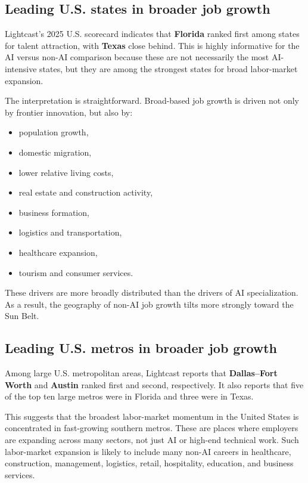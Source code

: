 \documentclass[12pt,a4paper]{article}
\begin{document}
\subsection{Leading U.S. states in broader job growth}

Lightcast's 2025 U.S. scorecard indicates that \textbf{Florida} ranked first among states for talent attraction, with \textbf{Texas} close behind. This is highly informative for the AI versus non-AI comparison because these are not necessarily the most AI-intensive states, but they are among the strongest states for broad labor-market expansion.

The interpretation is straightforward. Broad-based job growth is driven not only by frontier innovation, but also by:

\begin{itemize}
    \item population growth,
    \item domestic migration,
    \item lower relative living costs,
    \item real estate and construction activity,
    \item business formation,
    \item logistics and transportation,
    \item healthcare expansion,
    \item tourism and consumer services.
\end{itemize}

These drivers are more broadly distributed than the drivers of AI specialization. As a result, the geography of non-AI job growth tilts more strongly toward the Sun Belt.

\subsection{Leading U.S. metros in broader job growth}

Among large U.S. metropolitan areas, Lightcast reports that \textbf{Dallas--Fort Worth} and \textbf{Austin} ranked first and second, respectively. It also reports that five of the top ten large metros were in Florida and three were in Texas.

This suggests that the broadest labor-market momentum in the United States is concentrated in fast-growing southern metros. These are places where employers are expanding across many sectors, not just AI or high-end technical work. Such labor-market expansion is likely to include many non-AI careers in healthcare, construction, management, logistics, retail, hospitality, education, and business services.
\end{document}
